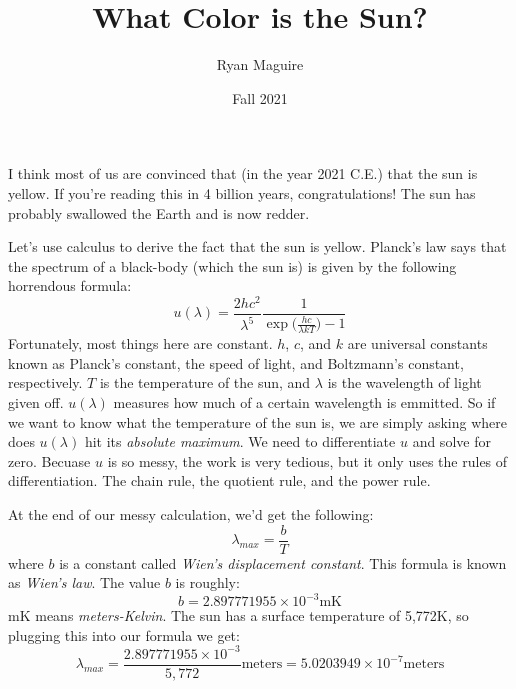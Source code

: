 \documentclass{article}
\title{What Color is the Sun?}
\author{Ryan Maguire}
\date{Fall 2021}
\begin{document}
    \maketitle
    I think most of us are convinced that (in the year 2021 C.E.) that the sun
    is yellow. If you're reading this in 4 billion years, congratulations! The
    sun has probably swallowed the Earth and is now redder.
    \par\hfill\par
    Let's use calculus to derive the fact that the sun is yellow. Planck's
    law says that the spectrum of a black-body (which the sun is) is given by
    the following horrendous formula:
    \begin{equation}
        u(\lambda)=
            \frac{2hc^{2}}{\lambda^{5}}
                \frac{1}{\exp\big(\frac{hc}{\lambda{k}T})-1}
    \end{equation}
    Fortunately, most things here are constant. $h$, $c$, and $k$ are universal
    constants known as Planck's constant, the speed of light, and
    Boltzmann's constant, respectively. $T$ is the temperature of the sun,
    and $\lambda$ is the wavelength of light given off. $u(\lambda)$ measures
    how much of a certain wavelength is emmitted. So if we want to know what
    the temperature of the sun is, we are simply asking where does $u(\lambda)$
    hit its \textit{absolute maximum}. We need to differentiate $u$ and solve
    for zero. Becuase $u$ is so messy, the work is very tedious, but it only
    uses the rules of differentiation. The chain rule, the quotient rule, and
    the power rule.
    \par\hfill\par
    At the end of our messy calculation, we'd get the following:
    \begin{equation}
        \lambda_{max}=\frac{b}{T}
    \end{equation}
    where $b$ is a constant called
    \textit{Wien's displacement constant}. This formula is known as
    \textit{Wien's law}. The value $b$ is roughly:
    \begin{equation}
        b=2.897771955\times{10}^{-3}\textrm{mK}
    \end{equation}
    mK means \textit{meters-Kelvin}. The sun has a surface temperature of
    5,772K, so plugging this into our formula we get:
    \begin{equation}
        \lambda_{max}=\frac{2.897771955\times{10}^{-3}}{5,772}\textrm{meters}
            =5.0203949\times{10}^{-7}\textrm{meters}
    \end{equation}
\end{document}
